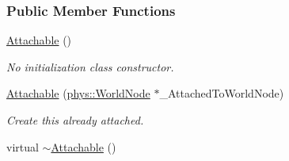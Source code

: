 \subsubsection*{Public Member Functions}
\begin{DoxyCompactItemize}
\item 
\hyperlink{classphys_1_1Attachable_a93c18f22769a1f70ae300fc2c58210eb}{Attachable} ()
\begin{DoxyCompactList}\small\item\em No initialization class constructor. \item\end{DoxyCompactList}\item 
\hyperlink{classphys_1_1Attachable_adec6826c5d9fada8b86d587d7d85a1ef}{Attachable} (\hyperlink{classphys_1_1WorldNode}{phys::WorldNode} $\ast$\_\-AttachedToWorldNode)
\begin{DoxyCompactList}\small\item\em Create this already attached. \item\end{DoxyCompactList}\item 
\hypertarget{classphys_1_1Attachable_af7187e29053b7fe339634394883729d4}{
virtual \hyperlink{classphys_1_1Attachable_af7187e29053b7fe339634394883729d4}{$\sim$Attachable} ()}
\label{df/dbd/classphys_1_1Attachable_af7187e29053b7fe339634394883729d4}


\end{DoxyCompactItemize}
